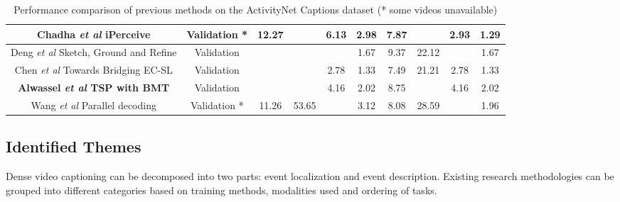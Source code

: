 \begin{table}[]
\begin{tabular}{|c|c|cccc|cccc|}
		Chadha \textit{et al} \cite{chadha2020iperceive} iPerceive                         & Validation *                  & \multicolumn{1}{c|}{12.27}      & \multicolumn{1}{c|}{}           & \multicolumn{1}{c|}{6.13}         & 2.98                  & \multicolumn{1}{c|}{7.87}       & \multicolumn{1}{l|}{}           & \multicolumn{1}{c|}{2.93}         & 1.29         \\ \hline
		Deng \textit{et al} \cite{deng2021sketch} Sketch, Ground and Refine           & Validation                    & \multicolumn{1}{c|}{}           & \multicolumn{1}{c|}{}           & \multicolumn{1}{l|}{}             & 1.67                  & \multicolumn{1}{c|}{9.37}       & \multicolumn{1}{c|}{22.12}      & \multicolumn{1}{c|}{}             & 1.67         \\ \hline
		Chen \textit{et al} \cite{chen2021towards} Towards Bridging EC-SL              & Validation                    & \multicolumn{1}{c|}{}           & \multicolumn{1}{c|}{}           & \multicolumn{1}{c|}{2.78}         & 1.33                  & \multicolumn{1}{c|}{7.49}       & \multicolumn{1}{c|}{21.21}      & \multicolumn{1}{c|}{2.78}         & 1.33         \\ \hline
		\textbf{Alwassel \textit{et al} \cite{alwassel2021tsp} TSP with BMT}           & Validation                    & \multicolumn{1}{c|}{}           & \multicolumn{1}{c|}{}           & \multicolumn{1}{c|}{4.16}         & 2.02                  & \multicolumn{1}{c|}{8.75}       & \multicolumn{1}{l|}{}           & \multicolumn{1}{c|}{4.16}         & 2.02         \\ \hline
		Wang \textit{et al} \cite{wang2021endtoend} Parallel decoding                   & Validation *                  & \multicolumn{1}{c|}{11.26}      & \multicolumn{1}{c|}{53.65}      & \multicolumn{1}{l|}{}             & 3.12                  & \multicolumn{1}{c|}{8.08}       & \multicolumn{1}{c|}{28.59}      & \multicolumn{1}{c|}{}             & 1.96         \\ \hline
	\end{tabular}

\centering
\caption{Performance comparison of previous methods on the ActivityNet Captions dataset (* some videos unavailable)}  \label{tab: performance-comparison}

\end{table}

\subsection{Identified Themes}
\par Dense video captioning can be decomposed into two parts: event localization and event description. Existing research methodologies can be grouped into different categories based on training methods, modalities used and ordering of tasks.

